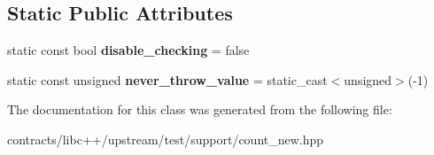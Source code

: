 \subsection*{Static Public Attributes}
\begin{DoxyCompactItemize}
\item 
\mbox{\label{class_mem_counter_accab6f5beb588a72a91360a2dac01341}} 
static const bool {\bfseries disable\+\_\+checking} = false
\item 
\mbox{\label{class_mem_counter_a16b854e60393e5dc235c5e0b6f4212ca}} 
static const unsigned {\bfseries never\+\_\+throw\+\_\+value} = static\+\_\+cast$<$unsigned$>$(-\/1)
\end{DoxyCompactItemize}


The documentation for this class was generated from the following file\+:\begin{DoxyCompactItemize}
\item 
contracts/libc++/upstream/test/support/count\+\_\+new.\+hpp\end{DoxyCompactItemize}

